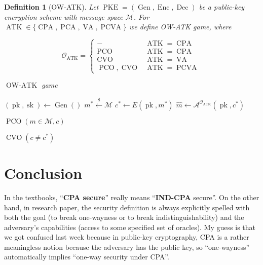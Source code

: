\documentclass{article}
\newcommand{\leftsample}{\overset{{\scriptscriptstyle\$}}{\leftarrow}}
\newcommand{\sk}{\operatorname{sk}}
\newcommand{\pco}{\operatorname{PCO}}
\newcommand{\cvo}{\operatorname{CVO}}
\newcommand{\llbrack}{[\![}
\newcommand{\rrbrack}{]\!]}
\newtheorem{definition}{Definition}[section]
\begin{document}
\begin{definition}[OW-ATK]
    Let $\operatorname{PKE} = (\operatorname{Gen}, \operatorname{Enc}, \operatorname{Dec})$ be a public-key encryption scheme with message space $\mathcal{M}$. For $\operatorname{ATK} \in \{\operatorname{CPA}, \operatorname{PCA}, \operatorname{VA}, \operatorname{PCVA}\}$ we define OW-ATK game, where

    \begin{equation*}
        \mathcal{O}_{\operatorname{ATK}} = \begin{cases}
            - & \operatorname{ATK} = \operatorname{CPA} \\
            \operatorname{PCO} & \operatorname{ATK} = \operatorname{CPA} \\
            \operatorname{CVO} & \operatorname{ATK} = \operatorname{VA} \\
            \operatorname{PCO}, \operatorname{CVO} & \operatorname{ATK} = \operatorname{PCVA}
        \end{cases}
    \end{equation*}

    \begin{multicols}{2}
        \begin{algorithm}[H]
            \caption{$\operatorname{OW-ATK}$ game}
            $(\operatorname{pk}, \operatorname{sk}) \leftarrow \operatorname{Gen}()$\;
            $m^\ast \leftsample \mathcal{M}$\;
            $c^\ast \leftarrow E(\operatorname{pk}, m^\ast)$\;
            $\hat{m} \leftarrow \mathcal{A}^{\mathcal{O}_{\operatorname{ATK}}}(\operatorname{pk}, c^\ast)$\;
            \Return{$\llbrack \hat{m} = m^\ast \rrbrack$}
        \end{algorithm}

        \begin{algorithm}[H]
            \caption{$\pco(m \in \mathcal{M}, c)$}
            \Return{$\llbrack D(\sk, c) = m \rrbrack$}
        \end{algorithm}

        \begin{algorithm}[H]
            \caption{$\cvo(c \neq c^\ast)$}
            \Return{$\llbrack D(\sk, c) \in \mathcal{M} \rrbrack$}
        \end{algorithm}
    \end{multicols}
\end{definition}

\section{Conclusion}
In the textbooks, ``\textbf{CPA secure}'' really means ``\textbf{IND-CPA} secure''. On the other hand, in research paper, the security definition is always explicitly spelled with both the goal (to break one-wayness or to break indistinguishability) and the adversary's capabilities (access to some specified set of oracles). My guess is that we got confused last week because in public-key cryptography, CPA is a rather meaningless notion because the adversary has the public key, so ``one-wayness'' automatically implies ``one-way security under CPA''.
\end{document}
